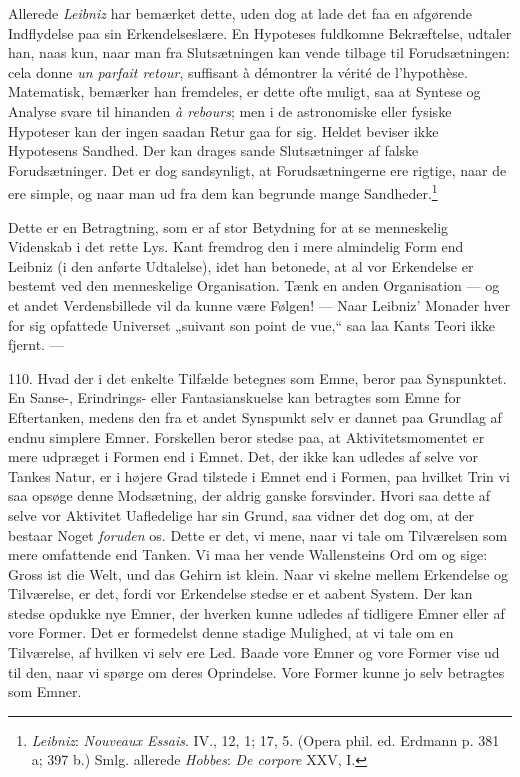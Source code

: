 \documentclass[12pt,a4paper]{book}
\newcommand{\apage}[1]{\marginnote{\footnotesize\textit{[#1]}}}
\begin{document}
Allerede \emph{Leibniz} har bemærket dette, uden dog at lade det faa en afgørende
Indflydelse paa sin Erkendelseslære. En Hypoteses fuldkomne Bekræftelse, udtaler
han, naas kun, naar man fra Slutsætningen kan vende tilbage til Forudsætningen:
cela donne \emph{un parfait retour}, suffisant à démontrer la vérité de
l'hypothèse. Matematisk, bemærker han fremdeles, er dette ofte muligt, saa at
Syntese og Analyse svare til hinanden \emph{à rebours}; men i de astronomiske eller
fysiske Hypoteser kan der ingen saadan Retur gaa for sig. Heldet beviser ikke
Hypotesens Sandhed. Der kan drages sande Slutsætninger af falske Forudsætninger.
Det er dog sandsynligt, at Forudsætningerne ere rigtige, naar de ere simple, og
naar man ud fra dem kan begrunde mange Sandheder.\footnote{\emph{Leibniz}:
\emph{Nouveaux Essais}. IV., 12, 1; 17, 5. (Opera phil. ed. Erdmann p. 381 a;
397 b.) Smlg. allerede \emph{Hobbes}: \emph{De corpore} XXV, I.}

Dette er en Betragtning, som er af stor Betydning for at \apage{262} se menneskelig Videnskab i
det rette Lys. Kant fremdrog den i mere almindelig Form end Leibniz (i den anførte
Udtalelse), idet han betonede, at al vor Erkendelse er bestemt ved den menneskelige
Organisation. Tænk en anden Organisation --- og et andet Verdensbillede vil da
kunne være Følgen! --- Naar Leibniz' Monader hver for sig opfattede Universet
„suivant son point de vue,“ saa laa Kants Teori ikke fjernt. ---

110. Hvad der i det enkelte Tilfælde betegnes som Emne, beror paa Synspunktet. En
Sanse-, Erindrings- eller Fantasianskuelse kan betragtes som Emne for Eftertanken,
medens den fra et andet Synspunkt selv er dannet paa Grundlag af endnu simplere
Emner. Forskellen beror stedse paa, at Aktivitetsmomentet er mere udpræget i Formen
end i Emnet. Det, der ikke kan udledes af selve vor Tankes Natur, er i højere Grad
tilstede i Emnet end i Formen, paa hvilket Trin vi saa opsøge denne Modsætning, der
aldrig ganske forsvinder. Hvori saa dette af selve vor Aktivitet Uafledelige har
sin Grund, saa vidner det dog om, at der bestaar Noget \emph{foruden} os. Dette er
det, vi mene, naar vi tale om Tilværelsen som mere omfattende end Tanken. Vi maa
her vende Wallensteins Ord om og sige: Gross ist die Welt, und das Gehirn ist
klein. Naar vi skelne mellem Erkendelse og Tilværelse, er det, fordi vor Erkendelse
stedse er et aabent System. Der kan stedse opdukke nye Emner, der hverken kunne
udledes af tidligere Emner eller af vore Former. Det er formedelst denne stadige
Mulighed, at vi tale om en Tilværelse, af hvilken vi selv ere Led. Baade vore Emner
og vore Former vise ud til den, naar vi spørge om deres Oprindelse. Vore Former
kunne jo selv betragtes som Emner.
\end{document}
